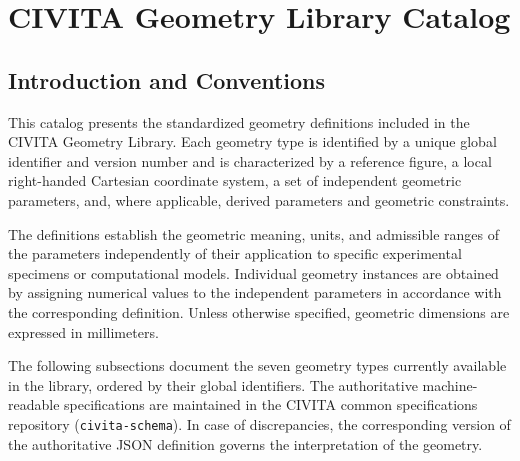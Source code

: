 \chapter{CIVITA Geometry Library Catalog}
\label{app:geometry-library}


\section{Introduction and Conventions}
\label{sec:geometry-definitions}

This catalog presents the standardized geometry definitions included in the CIVITA Geometry Library. Each geometry type is identified by a unique global identifier and version number and is characterized by a reference figure, a local right-handed Cartesian coordinate system, a set of independent geometric parameters, and, where applicable, derived parameters and geometric constraints.

The definitions establish the geometric meaning, units, and admissible ranges of the parameters independently of their application to specific experimental specimens or computational models. Individual geometry instances are obtained by assigning numerical values to the independent parameters in accordance with the corresponding definition. Unless otherwise specified, geometric dimensions are expressed in millimeters.

The following subsections document the seven geometry types currently available in the library, ordered by their global identifiers. The authoritative machine-readable specifications are maintained in the CIVITA common specifications repository (\texttt{civita-schema}). In case of discrepancies, the corresponding version of the authoritative JSON definition governs the interpretation of the geometry.

















